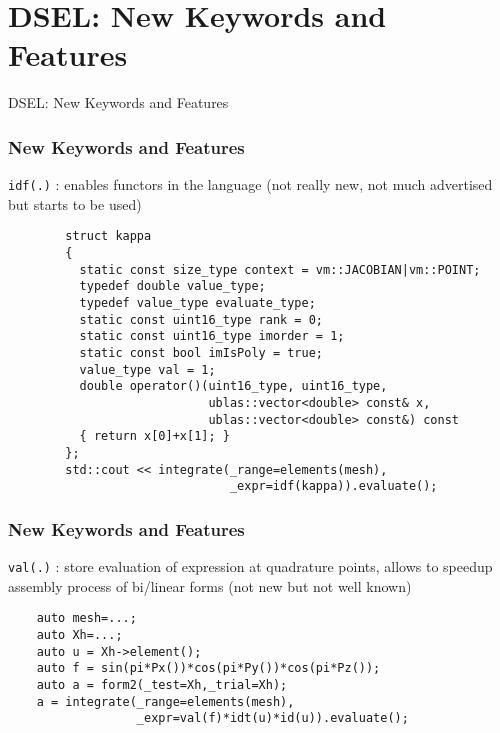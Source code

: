 \section{DSEL: New Keywords and Features}
\begin{frame}[fragile]{DSEL: New Keywords and Features}
\end{frame}
\begin{frame}[fragile]
  \frametitle{New Keywords and Features}
  \texttt{idf(.)} : enables functors in the language (not
  really new, not much advertised but starts to be used)
  \begin{verbatim}
        struct kappa
        {
          static const size_type context = vm::JACOBIAN|vm::POINT;
          typedef double value_type;
          typedef value_type evaluate_type;
          static const uint16_type rank = 0;
          static const uint16_type imorder = 1;
          static const bool imIsPoly = true;
          value_type val = 1;
          double operator()(uint16_type, uint16_type,
                            ublas::vector<double> const& x,
                            ublas::vector<double> const&) const
          { return x[0]+x[1]; }
        };
        std::cout << integrate(_range=elements(mesh),
                               _expr=idf(kappa)).evaluate();
      \end{verbatim}

\end{frame}
\begin{frame}[fragile]
  \frametitle{New Keywords and Features}
  \texttt{val(.)} : store evaluation of expression at
  quadrature points, allows to speedup assembly process of bi/linear
  forms (not new but not well known)
  \begin{verbatim}
    auto mesh=...;
    auto Xh=...;
    auto u = Xh->element();
    auto f = sin(pi*Px())*cos(pi*Py())*cos(pi*Pz());
    auto a = form2(_test=Xh,_trial=Xh);
    a = integrate(_range=elements(mesh),
                  _expr=val(f)*idt(u)*id(u)).evaluate();
  \end{verbatim}
\end{frame}

